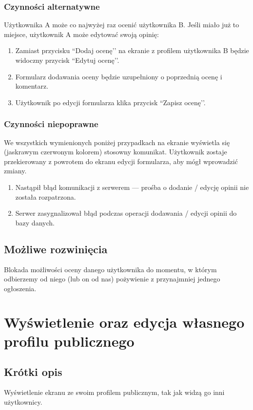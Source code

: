 \documentclass[12pt,a4paper,twoside]{article}
\begin{document}
    \subsubsection{Czynności alternatywne}
    Użytkownika A może co najwyżej raz ocenić użytkownika B. Jeśli miało już to miejsce, użytkownik A może edytować swoją opinię:
    \begin{enumerate}
        \item Zamiast przycisku ``Dodaj ocenę’’ na ekranie z profilem użytkownika B będzie widoczny przycisk ``Edytuj ocenę’’.
        \item Formularz dodawania oceny będzie uzupełniony o poprzednią ocenę i komentarz.
        \item Użytkownik po edycji formularza klika przycisk ``Zapisz ocenę’’.
    \end{enumerate}


    \subsubsection{Czynności niepoprawne}
    We wszystkich wymienionych poniżej przypadkach na ekranie wyświetla się (jaskrawym czerwonym kolorem) stosowny komunikat. Użytkownik zostaje
    przekierowany z powrotem do ekranu edycji formularza, aby mógł wprowadzić zmiany.
    \begin{enumerate}
        \item Nastąpił błąd komunikacji z serwerem --- prośba o dodanie / edycję opinii nie została rozpatrzona.
        \item Serwer zasygnalizował błąd podczas operacji dodawania / edycji opinii do bazy danych.
    \end{enumerate}


    \subsection{Możliwe rozwinięcia}
    Blokada możliwości oceny danego użytkownika do momentu, w którym odbierzemy od niego (lub on od nas) pożywienie z przynajmniej jednego ogłoszenia.


    \section{Wyświetlenie oraz edycja własnego profilu publicznego}

    \subsection{Krótki opis}
    Wyświetlenie ekranu ze swoim profilem publicznym, tak jak widzą go inni użytkownicy.
\end{document}
